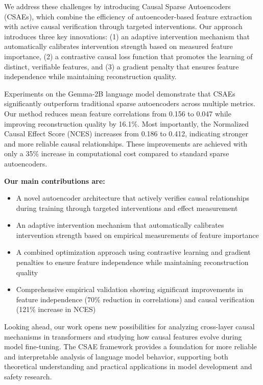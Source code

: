 \documentclass{article} %
\begin{document}
We address these challenges by introducing Causal Sparse Autoencoders (CSAEs), which combine the efficiency of autoencoder-based feature extraction with active causal verification through targeted interventions. Our approach introduces three key innovations: (1) an adaptive intervention mechanism that automatically calibrates intervention strength based on measured feature importance, (2) a contrastive causal loss function that promotes the learning of distinct, verifiable features, and (3) a gradient penalty that ensures feature independence while maintaining reconstruction quality.

Experiments on the Gemma-2B language model demonstrate that CSAEs significantly outperform traditional sparse autoencoders across multiple metrics. Our method reduces mean feature correlations from 0.156 to 0.047 while improving reconstruction quality by 16.1\%. Most importantly, the Normalized Causal Effect Score (NCES) increases from 0.186 to 0.412, indicating stronger and more reliable causal relationships. These improvements are achieved with only a 35\% increase in computational cost compared to standard sparse autoencoders.

\noindent\textbf{Our main contributions are:}
\begin{itemize}
    \item A novel autoencoder architecture that actively verifies causal relationships during training through targeted interventions and effect measurement
    \item An adaptive intervention mechanism that automatically calibrates intervention strength based on empirical measurements of feature importance
    \item A combined optimization approach using contrastive learning and gradient penalties to ensure feature independence while maintaining reconstruction quality
    \item Comprehensive empirical validation showing significant improvements in feature independence (70\% reduction in correlations) and causal verification (121\% increase in NCES)
\end{itemize}

Looking ahead, our work opens new possibilities for analyzing cross-layer causal mechanisms in transformers and studying how causal features evolve during model fine-tuning. The CSAE framework provides a foundation for more reliable and interpretable analysis of language model behavior, supporting both theoretical understanding and practical applications in model development and safety research.
\end{document}

